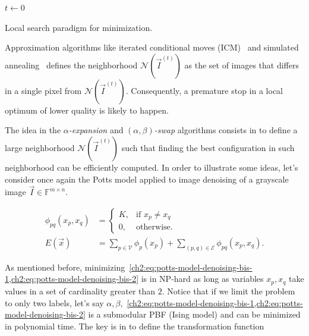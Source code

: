 \begin{algorithm}
 \LinesNumbered
 
  \BlankLine
  
 $t \longleftarrow 0$\;
 \BlankLine
 
 \caption{Local search paradigm for minimization.}
 \label{ch2:alg:local-search-paradigm}
\end{algorithm}

Approximation algorithms like iterated conditional moves (ICM)~\cite{besag86} and simulated annealing~\cite{geman84} defines the neighborhood $\mathcal{N}(\vec{I}^{(t)})$ as the set of images that differs in a single pixel from $\mathcal{N}(\vec{I}^{(t)})$. Consequently, a premature stop in a local optimum of lower quality is likely to happen. 

The idea in the \emph{$\alpha$-expansion} and \emph{$(\alpha,\beta)$-swap} algorithms consists in to define a large neighborhood $\mathcal{N}(\vec{I}^{(t)})$ such that finding the best configuration in such neighborhood can be efficiently computed. In order to illustrate some ideas, let's consider once again the Potts model applied to image denoising of a grayscale image $\vec{I} \in \mathbb{F}^{m \times n}$.

\begin{align}
	\phi_{pq}(x_p,x_q) &= \left\{ \begin{array}{ll}
		K,& \text{if } x_p \neq x_q \\
		0,& \text{otherwise}.
	\end{array}\right. \label{ch2:eq:potts-model-denoising-bis-1} \\[1em]
	E(\vec{x}) &= \sum_{p \in \mathcal{V} }{\phi_p(x_p)} + \sum_{(p,q) \in \mathcal{E}}{\phi_{pq}(x_p,x_q)}.	
	\label{ch2:eq:potts-model-denoising-bis-2}
\end{align}


As mentioned before, minimizing~\cref{ch2:eq:potts-model-denoising-bis-1,ch2:eq:potts-model-denoising-bis-2} is in NP-hard as long as variables $x_p,x_q$ take values in a set of cardinality greater than $2$. Notice that if we limit the problem to only two labels, let's say $\alpha,\beta$,~\cref{ch2:eq:potts-model-denoising-bis-1,ch2:eq:potts-model-denoising-bis-2} is a submodular PBF (Ising model) and can be minimized in polynomial time. The key is in to define the transformation function 

